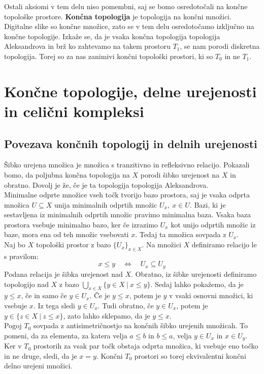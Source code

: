 \documentclass[a4paper, 12pt]{book}
\theoremstyle{definition}
\theoremstyle{remark}
\begin{document}
Ostali aksiomi v tem delu niso pomembni, saj se bomo osredotočali na končne
topološke prostore. \textbf{Končna topologija} je topologija na končni množici. Digitalne slike so
končne množice, zato se v tem delu osredotočamo izključno na končne topologije.
Izkaže se, da je vsaka končna topologija topologija Aleksandrova in brž ko zahtevamo
na takem prostoru $T_1$, se nam porodi diskretna topologija. Torej so za nas zanimivi
končni topološki prostori, ki so $T_0$ in ne $T_1$.

\chapter{Končne topologije, delne urejenosti in celični kompleksi}
\section{Povezava končnih topologij in delnih urejenosti}\label{poset-top}
Šibko urejena množica je množica s tranzitivno in refleksivno relacijo.
Pokazali bomo, da poljubna končna topologija na $X$ porodi šibko urejenost na $X$ in obratno.
Dovolj je že, če je ta topologija topologija Aleksandrova.\\
Minimalne odprte množice vseh točk tvorijo bazo prostora,
saj je vsaka odprta množica $U \subseteq X$ unija minimalnih odprtih množic $U_x,\ x\in U$.
Bazi, ki je sestavljena iz minimalnih odprtih množic pravimo minimalna baza.
Vsaka baza prostora vsebuje minimalno bazo,
ker če izrazimo $U_x$ kot unijo odprtih množic iz baze, mora ena od teh množic
vsebovati $x$. Tedaj ta množica sovpada z $U_x$.\\
Naj bo $X$ topološki prostor z bazo $\{U_x\}_{x \in X}$. Na množici $X$ definiramo
relacijo le s pravilom:
\[x \leq y\quad \Longleftrightarrow\quad U_x \subseteq U_y\]
Podana relacija je šibka urejenost nad $X$. Obratno, iz šibke urejenosti
definiramo topologijo nad $X$ z bazo $\bigcup_{x\in X}\{y \in X\ |\ x \leq y\}$.
Sedaj lahko pokažemo, da je $y \leq x$, če in samo če $y \in U_x$.
Če je $y \leq x$, potem je $y$ v vsaki osnovni množici, ki vsebuje $x$. Iz tega sledi $y \in U_x$.
Tudi obratno, če $y \in U_x$, potem je $y \in \{z \in X\ |\ z \leq x\}$, zato lahko sklepamo, da je $y \leq x$.\\
Pogoj $T_0$ sovpada z antisimetričnostjo na končnih šibko urejenih množicah.
To pomeni, da za elementa, za katera velja $a \leq b$ in $b \leq a$, velja $y \in U_x$ in $x \in U_y$.
Ker v $T_0$ prostorih za vsak par točk obstaja odprta množica,
ki vsebuje eno točko in ne druge, sledi, da je $x = y$. Končni $T_0$ prostori so
torej ekvivalentni končni delno urejeni množici.\\
\end{document}
